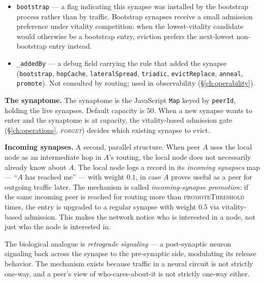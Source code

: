 \documentclass[twoside,nobib]{tufte-book}
\begin{document}
\begin{itemize}
  reinforcements this synapse has received. Used by the
  incoming-synapse promotion rule (\S\ref{ch:operations}) and as
  a debug signal.
  \item \texttt{bootstrap} --- a flag indicating this synapse was
  installed by the bootstrap process rather than by traffic.
  Bootstrap synapses receive a small admission preference under
  vitality competition: when the lowest-vitality
  candidate would otherwise be a bootstrap entry, eviction
  prefers the next-lowest non-bootstrap entry instead.
  \item \texttt{\_addedBy} --- a debug field carrying the rule that
  added the synapse (\texttt{bootstrap}, \texttt{hopCache},
  \texttt{lateralSpread}, \texttt{triadic}, \texttt{evictReplace},
  \texttt{anneal}, \texttt{promote}). Not consulted by routing;
  used in observability (\S\ref{ch:operability}).
\end{itemize}

\textbf{The synaptome.} The synaptome is the JavaScript \texttt{Map}
keyed by \texttt{peerId}, holding the live synapses. Default
capacity is $50$. When a new synapse wants to enter and the
synaptome is at capacity, the vitality-based admission gate
(\S\ref{ch:operations}, \emph{\textsc{forget}}) decides which
existing synapse to evict.

\textbf{Incoming synapses.} A second, parallel structure. When peer
$A$ uses the local node as an intermediate hop in $A$'s routing,
the local node does not necessarily already know about $A$. The
local node logs a record in its \emph{incoming synapses} map ---
``$A$ has reached me'' --- with weight $0.1$, in case $A$ proves
useful as a peer for outgoing traffic later. The mechanism is
called \emph{incoming-synapse promotion}: if the same incoming
peer is reached for routing more than \textsc{promoteThreshold}
times, the entry is upgraded to a regular synapse with weight
$0.5$ via vitality-based admission. This makes the network notice
who is interested in a node, not just who the node is interested
in.

The biological analogue is \emph{retrograde signaling} --- a
post-synaptic neuron signaling back across the synapse to the
pre-synaptic side, modulating its release behavior. The mechanism
exists because traffic in a neural circuit is not strictly one-way,
and a peer's view of who-cares-about-it is not strictly one-way
either.
\end{document}
